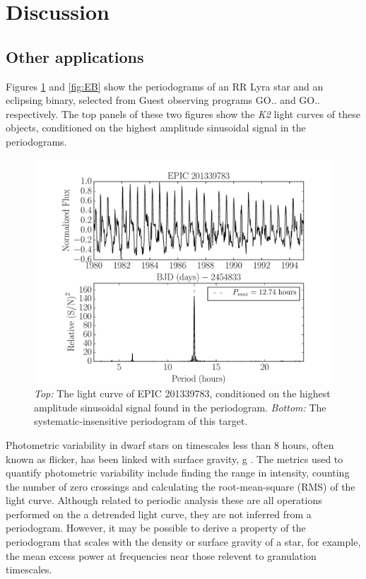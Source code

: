 \documentclass[useAMS, usenatbib]{aastex}
\begin{document}
\section{Discussion}

\subsection{Other applications}
Figures \ref{fig:RRLyrae} and \ref{fig:EB}
show the periodograms of an RR Lyra star and an eclipsing binary, selected
from Guest observing programs GO.. and GO..
respectively.
The top panels of these two figures show the {\it K2} light curves of these
objects, conditioned on the highest amplitude sinusoidal signal in the
periodograms.

\begin{figure}
\begin{center}
\includegraphics[width=6in, clip=true]{RR_201339783.pdf}
\caption{{\it Top:} The light curve of EPIC 201339783, conditioned on the
	highest amplitude sinusoidal signal found in the periodogram.
	{\it Bottom:} The systematic-insensitive periodogram of this target.}
\label{fig:RRLyrae}
\end{center}
\end{figure}

Photometric variability in dwarf stars on timescales less than 8 hours, often
known as flicker, has been linked with surface gravity, g
\citep[][]{Bastien2013, Kipping}.
The metrics used to quantify photometric variability include finding the range
in intensity, counting the number of zero crossings and calculating the
root-mean-square (RMS) of the light curve.
Although related to periodic analysis these are all operations performed on the
a detrended light curve, they are not inferred from a periodogram.
However, it may be possible to derive a property of the periodogram that scales
with the density or surface gravity of a star, for example, the mean excess
power at frequencies near those relevent to granulation timescales.
\end{document}
